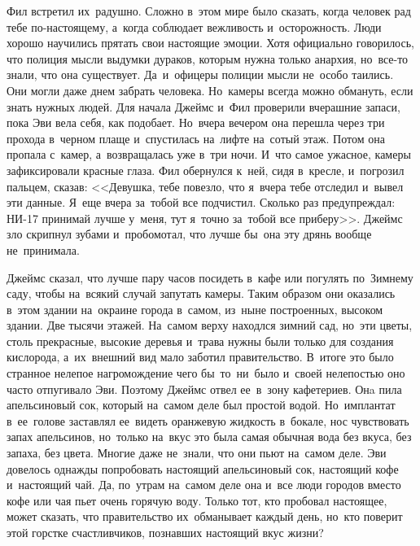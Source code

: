Фил встретил их~радушно.
Сложно в~этом мире было сказать, когда человек рад тебе по-настоящему, а~когда соблюдает вежливость и~осторожность.
Люди хорошо научились прятать свои настоящие эмоции.
Хотя официально говорилось, что полиция мысли выдумки дураков, которым нужна только анархия, но~все-то знали, что она существует.
Да~и~офицеры полиции мысли не~особо таились.
Они могли даже днем забрать человека.
Но~камеры всегда можно обмануть, если знать нужных людей.
Для начала Джеймс и~Фил проверили вчерашние запаси, пока Эви вела себя, как подобает.
Но~вчера вечером она перешла через три прохода в~черном плаще и~спустилась на~лифте на~сотый этаж.
Потом она пропала с~камер, а~возвращалась уже в~три ночи.
И~что самое ужасное, камеры зафиксировали красные глаза.
Фил обернулся к~ней, сидя в~кресле, и~погрозил пальцем, сказав: <<Девушка, тебе повезло, что я~вчера тебе отследил и~вывел эти данные.
Я~еще вчера за~тобой все подчистил.
Сколько раз предупреждал: НИ-17 принимай лучше у~меня, тут я~точно за~тобой все приберу>>.
Джеймс зло скрипнул зубами и~пробомотал, что лучше бы~она эту дрянь вообще не~принимала.

Джеймс сказал, что лучше пару часов посидеть в~кафе или погулять по~Зимнему саду, чтобы на~всякий случай запутать камеры.
Таким образом они оказались в~этом здании на~окраине города в~самом, из~ныне построенных, высоком здании.
Две тысячи этажей.
На~самом верху находлся зимний сад, но~эти цветы, столь прекрасные, высокие деревья и~трава нужны были только для создания кислорода, а~их~внешний вид мало заботил правительство.
В~итоге это было странное нелепое нагромождение чего бы~то~ни~было и~своей нелепостью оно часто отпугивало Эви.
Поэтому Джеймс отвел ее~в~зону кафетериев.
Онa пила апельсиновый сок, который на~самом деле был простой водой.
Но~имплантат в~ее~голове заставлял ее~видеть оранжевую жидкость в~бокале, нос чувствовать запах апельсинов, но~только на~вкус это была самая обычная вода без вкуса, без запаха, без цвета.
Многие даже не~знали, что они пьют на~самом деле.
Эви довелось однажды попробовать настоящий апельсиновый сок, настоящий кофе и~настоящий чай.
Да, по~утрам на~самом деле она и~все люди городов вместо кофе или чая пьет очень горячую воду.
Только тот, кто пробовал настоящее, может сказать, что правительство их~обманывает каждый день, но~кто поверит этой горстке счастливчиков, познавших настоящий вкус жизни? 

